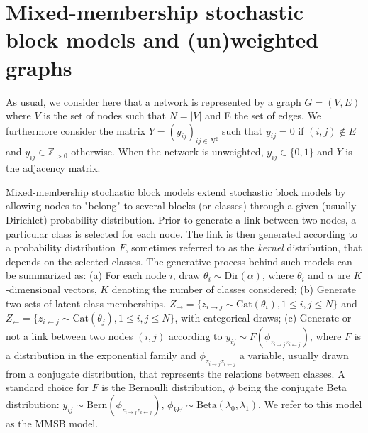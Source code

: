 \section{Mixed-membership stochastic block models and (un)weighted graphs}
\label{sec:model}

As usual, we consider here that a network is represented by a graph $G=(V,E)$ where $V$ is the set of nodes such that $N=|V|$ and E the set of edges. We furthermore consider the matrix $Y=(y_{ij})_{ij\in N^2}$ such that $y_{ij}=0$ if $(i,j) \notin E$ and $y_{ij} \in \mathbb{Z}_{>0}$ otherwise. When the network is unweighted, $y_{ij} \in \{0,1\}$ and $Y$ is the adjacency matrix.

Mixed-membership stochastic block models extend stochastic block models \cite{airoldi2009mixed} by allowing nodes to "belong" to several blocks (or classes) through a given (usually Dirichlet) probability distribution. Prior to generate a link between two nodes, a particular class is selected for each node. The link is then generated according to a probability distribution $F$, sometimes referred to as the \textit{kernel} distribution, that depends on the selected classes. The generative process behind such models can be summarized as: (a) For each node $i$, draw $\theta_i \sim \textrm{Dir}(\alpha)$, where $\theta_i$ and $\alpha$ are $K$-dimensional vectors, $K$ denoting  the number of classes considered; (b) Generate two sets of latent class memberships, $Z_\rightarrow = \{z_{i\rightarrow j} \sim \textrm{Cat}(\theta_i),  1 \le i,j \le N\}$ and $Z_\leftarrow = \{z_{i\leftarrow j} \sim \textrm{Cat}(\theta_j),  1 \le i,j \le N\}$, with categorical draws; (c) Generate or not a link between two nodes $(i,j)$ according to $y_{ij} \sim F(\phi_{z_{i \rightarrow j}z_{i \leftarrow j}})$, where $F$ is a distribution in the exponential family and $\phi_{z_{i \rightarrow j}z_{i \leftarrow j}}$ a variable, usually drawn from a conjugate distribution, that represents the relations between classes. A standard choice for $F$ is the Bernoulli distribution, $\phi$ being the conjugate Beta distribution: $y_{ij} \sim \textrm{Bern}(\phi_{z_{i \rightarrow j}z_{i \leftarrow j}}), \, \phi_{kk'} \sim \textrm{Beta}(\lambda_0, \lambda_1)$. We refer to this model as the MMSB model.

